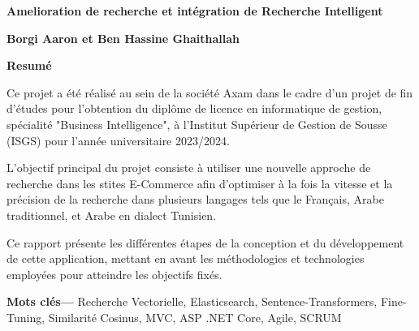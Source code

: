 \providecommand{\motscles}[1]
{
  \large
  \textbf{Mots clés---} #1
}

\thispagestyle{plain}
\begin{center}
    \Large
    \textbf{Amelioration de recherche et intégration de Recherche Intelligent}
        
    \vspace{0.4cm}
    \textbf{Borgi Aaron et Ben Hassine Ghaithallah}
       
    \vspace{0.9cm}
    \textbf{Resumé}
\end{center}
Ce projet a été réalisé au sein de la société Axam dans le cadre d'un projet de fin d'études pour l'obtention du diplôme de licence en informatique de gestion, spécialité "Business
Intelligence", à l'Institut Supérieur de Gestion de Sousse (ISGS) pour l'année universitaire
2023/2024.

\vspace*{0.5cm}
\noindent
L'objectif principal du projet consiste à utiliser une nouvelle approche de recherche dans les stites E-Commerce afin d'optimiser à la fois la vitesse et la précision de la recherche dans plusieurs langages tels que le Français, Arabe traditionnel, et Arabe en dialect Tunisien.

\vspace*{0.5cm}
\noindent
Ce rapport présente les différentes étapes de la conception et du développement de cette
application, mettant en avant les méthodologies et technologies employées pour atteindre les
objectifs fixés.

\noindent
\motscles{Recherche Vectorielle, Elasticsearch, Sentence-Transformers, Fine-Tuning, Similarité Cosinus, MVC, ASP .NET Core, Agile, SCRUM}